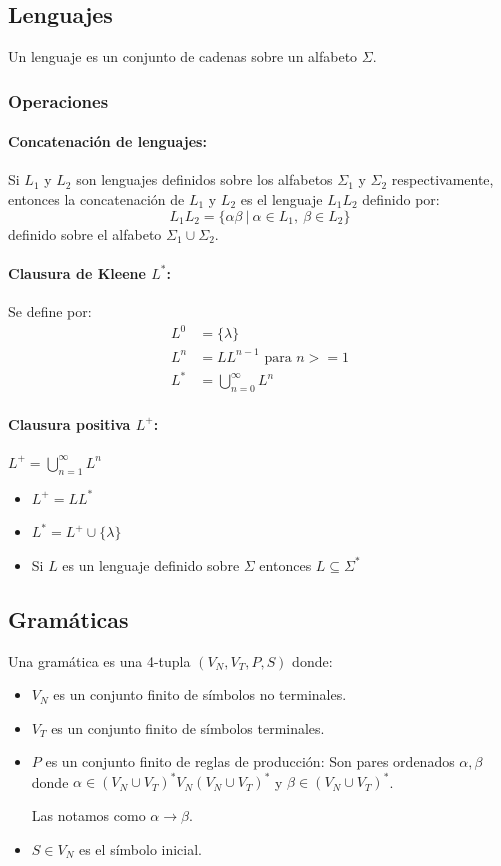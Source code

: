 \subsection{Lenguajes}
Un lenguaje es un conjunto de cadenas sobre un alfabeto \(\Sigma\).

\subsubsection{Operaciones}
\paragraph{Concatenación de lenguajes:} Si \(L_1\) y \(L_2\) son lenguajes definidos sobre los alfabetos \(\Sigma_1\) y \(\Sigma_2\) respectivamente, entonces la concatenación de \(L_1\) y \(L_2\) es el lenguaje \(L_1L_2\) definido por:
\[ L_1L_2 = \{ \alpha\beta~|~\alpha\in L_1,~\beta\in L_2\}\]
definido sobre el alfabeto \( \Sigma_1\cup\Sigma_2\).

\paragraph*{Clausura de Kleene \(L^*\):} Se define por:
\begin{align*}
  L^0 & = \{\lambda\}                 \\
  L^n & = LL^{n-1} \text{ para } n>=1 \\
  L^* & = \bigcup_{n=0}^\infty L^n
\end{align*}
\paragraph{Clausura positiva \(L^+\):} \(L^+ = \bigcup_{n=1}^\infty L^n\)
\begin{itemize}
  \item \(L^+ = LL^*\)
  \item \(L^* = L^+\cup\{\lambda\}\)
  \item Si \(L\) es un lenguaje definido sobre \(\Sigma\) entonces \(L\subseteq\Sigma^*\)
\end{itemize}
\subsection{Gramáticas}
Una gramática es una 4-tupla \((V_N,V_T,P,S)\) donde:
\begin{itemize}
  \item \(V_N\) es un conjunto finito de símbolos no terminales.
  \item \(V_T\) es un conjunto finito de símbolos terminales.
  \item \(P\) es un conjunto finito de reglas de producción: Son pares ordenados \(\alpha,\beta\) donde \(\alpha\in(V_N\cup V_T)^*V_N(V_N\cup V_T)^*\) y \(\beta\in(V_N\cup V_T)^*\).

        Las notamos como \(\alpha\to\beta\).
  \item \(S\in V_N\) es el símbolo inicial.
\end{itemize}

